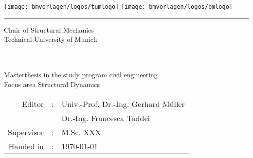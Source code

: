 {
\begin{titlepage}
	
	\begin{center}
		{
			\fontsize{18}{18}\selectfont 
			
			\texttt{[image: bmvorlagen/logos/tumlogo]} \hfill \texttt{[image: bmvorlagen/logos/bmlogo]}
			\vspace{0.5cm}
			\hrule
			
			\vspace{1cm}
			Chair of Structural Mechanics\\
			Technical University of Munich\\
			
			\vspace{1.4cm}
			
			\vspace{2cm}
			
			
			\vspace{3mm}
			
			
			
			\bmtitle \\[5ex]
			
			
			\bmauthor \\[7ex]
			
			
			Masterthesis in the study program civil engineering\\
			Focus area Structural Dynamics\\
			
			\vspace{1.8cm}
			
			{\fontsize{12pt}{12} \selectfont%
				\begin{tabular}{rll}
					Editor&:& Univ.-Prof. Dr.-Ing. Gerhard Müller\\
					& & Dr.-Ing. Francesca Taddei\\[0.5ex]
					Supervisor&:& M.Sc. XXX\\[0.5ex]
					Handed in&:& \today
				\end{tabular}
			}
			
			
		}
	\end{center}
	
\end{titlepage}
}

